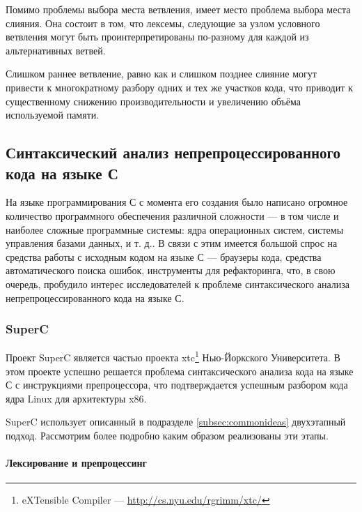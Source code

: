 Помимо проблемы выбора места ветвления, имеет место проблема выбора места слияния. Она состоит в том, что лексемы, следующие за узлом условного ветвления могут быть проинтерпретированы по-разному для каждой из альтернативных ветвей.

Слишком раннее ветвление, равно как и слишком позднее слияние могут привести к многократному разбору одних и тех же участков кода, что приводит к существенному снижению производительности и увеличению объёма используемой памяти.


\subsection{Синтаксический анализ непрепроцессированного кода на языке С}

На языке программирования С с момента его создания было написано огромное количество программного обеспечения различной сложности --- в том числе и наиболее сложные программные системы: ядра операционных систем, системы управления базами данных, и т. д.. В связи с этим имеется большой спрос на средства работы с исходным кодом на языке С --- браузеры кода, средства автоматического поиска ошибок, инструменты для рефакторинга, что, в свою очередь, пробудило интерес исследователей к проблеме синтаксического анализа непрепроцессированного кода на языке С.

\subsubsection{SuperC}

Проект SuperC является частью проекта xtc\footnote{eXTensible Compiler --- \url{http://cs.nyu.edu/rgrimm/xtc/}} Нью-Йоркского Университета. В этом проекте успешно решается проблема синтаксического анализа кода на языке С с инструкциями препроцессора, что подтверждается успешным разбором кода ядра Linux для архитектуры x86.

SuperC использует описанный в подразделе \ref{subsec:commonideas} двухэтапный подход. Рассмотрим более подробно каким образом реализованы эти этапы.

\paragraph{Лексирование и препроцессинг}
\label{lexingandpreprocessing}

